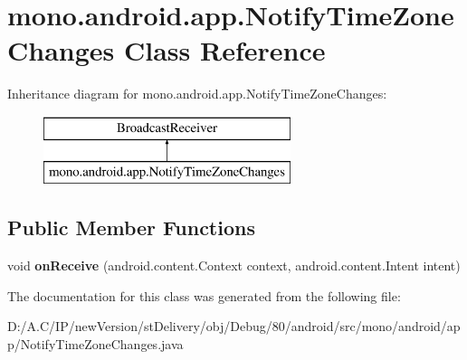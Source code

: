 \hypertarget{classmono_1_1android_1_1app_1_1_notify_time_zone_changes}{}\section{mono.\+android.\+app.\+Notify\+Time\+Zone\+Changes Class Reference}
\label{classmono_1_1android_1_1app_1_1_notify_time_zone_changes}
Inheritance diagram for mono.\+android.\+app.\+Notify\+Time\+Zone\+Changes\+:\begin{figure}[H]
\begin{center}
\leavevmode
\includegraphics[height=2.000000cm]{classmono_1_1android_1_1app_1_1_notify_time_zone_changes}
\end{center}
\end{figure}
\subsection*{Public Member Functions}
\begin{DoxyCompactItemize}
\item 
\mbox{\label{classmono_1_1android_1_1app_1_1_notify_time_zone_changes_a07a0e630ae667b83ee774709cc89f20b}} 
void {\bfseries on\+Receive} (android.\+content.\+Context context, android.\+content.\+Intent intent)
\end{DoxyCompactItemize}


The documentation for this class was generated from the following file\+:\begin{DoxyCompactItemize}
\item 
D\+:/\+A.\+C/\+I\+P/new\+Version/st\+Delivery/obj/\+Debug/80/android/src/mono/android/app/Notify\+Time\+Zone\+Changes.\+java\end{DoxyCompactItemize}
